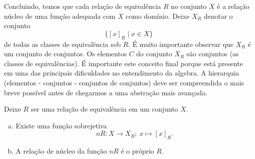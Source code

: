          Concluindo, temos que cada relação de equivalência $R$ no conjunto $X$ é a relação núcleo de uma função adequada com $X$ como domínio. Deixe $X_{R}$ denotar o conjunto $$\{\left[x\right]_{R} \mid x \in X\}$$ de todas as classes de equivalência sob $R$. É muito importante observar que $X_{R}$ é um conjunto de conjuntos. Os elementos $C$ do conjunto $X_{R}$ são conjuntos (as classes de equivalências). É importante este conceito final porque está presente em uma das principais dificuldades no entendimento da algebra. A hierarquia (elementos - conjuntos - conjuntos de conjuntos) deve ser compreendida o mais breve possível antes de chegarmos a uma abstração mais avançada.
         \begin{stat}
            Deixe $R$ ser uma relação de equivalência em um conjunto $X$.
            \begin{enumerate}[(a)]
               \item Existe uma função sobrejetiva $$nR: X\to X_{R};\ x\mapsto \left[x\right]_{R}.$$
               \item A relação de núcleo da função $nR$ é o próprio $R$.
            \end{enumerate}
         \end{stat}
      \newpage


